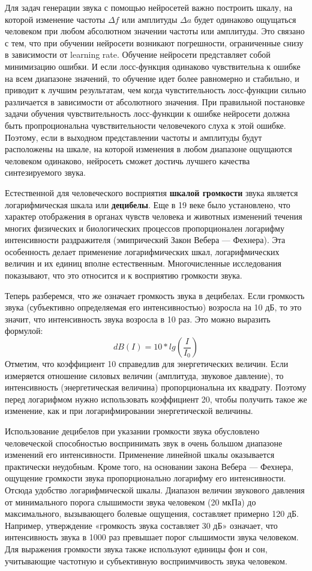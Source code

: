 Для задач генерации звука с помощью нейросетей важно построить шкалу, 
на которой изменение частоты $\Delta f$ или амплитуды $\Delta a$ будет одинаково ощущаться человеком при любом абсолютном значении частоты или амплитуды.
Это связано с тем, что при обучении нейросети возникают погрешности, ограниченные снизу в зависимости от learning rate. 
Обучение нейросети представляет собой минимизацию ошибки. 
И если лосс-функция одинаково чувствительна к ошибке на всем диапазоне значений, то обучение идет более равномерно и стабильно, и приводит к лучшим результатам,
чем когда чувстительность лосс-функции сильно различается в зависимости от абсолютного значения.
При правильной постановке задачи обучения чувствительность лосс-функции к ошибке нейросети должна быть пропроциональна чувствительности человечекого слуха к этой ошибке. 
Поэтому, если в выходном представлении частоты и амплитуды будут расположены на шкале, на которой изменения в любом диапазоне ощущаются человеком одинаково, 
нейросеть сможет достичь лучшего качества синтезируемого звука.

Естественной для человеческого восприятия \textbf{шкалой громкости} звука является логарифмическая шкала или \textbf{децибелы}.
Еще в 19 веке было установлено, что характер отображения в органах чувств человека и животных изменений течения многих физических и 
биологических процессов пропорционален логарифму интенсивности раздражителя (эмипрический Закон Вебера — Фехнера).
Эта особенность делает применение логарифмических шкал, логарифмических величин и их единиц вполне естественным.
Многочисленные исследования показывают, что это относится и к восприятию громкости звука.

Теперь разберемся, что же означает громкость звука в децибелах. 
Если громкость звука (субъективно определяемая его интенсивностью) возросла на 10 дБ, то это значит, что интенсивность звука возросла в 10 раз.
Это можно выразить формулой:
\begin{equation}
  dB(I) = 10 * lg(\frac{I}{I_0})
\end{equation}
Отметим, что коэффициент 10 справедлив для энергетических величин. 
Если измеряется отношение силовых величин (амплитуда, звуковое давление), то интенсивность (энергетическая величина) пропорциональна их квадрату. 
Поэтому перед логарифмом нужно использовать коэффициент 20, чтобы получить такое же изменение, как и при логарифмировании энергетической величины.

Использование децибелов при указании громкости звука обусловлено человеческой способностью воспринимать звук в очень большом диапазоне изменений его интенсивности. 
Применение линейной шкалы оказывается практически неудобным. Кроме того, на основании закона Вебера — Фехнера, 
ощущение громкости звука пропорционально логарифму его интенсивности. Отсюда удобство логарифмической шкалы. 
Диапазон величин звукового давления от минимального порога слышимости звука человеком (20 мкПа) до максимального, 
вызывающего болевые ощущения, составляет примерно 120 дБ. 
Например, утверждение «громкость звука составляет 30 дБ» означает, что интенсивность звука в 1000 раз превышает порог слышимости звука человеком.
Для выражения громкости звука также используют единицы фон и сон, учитывающие частотную и субъективную восприимчивость звука человеком.

